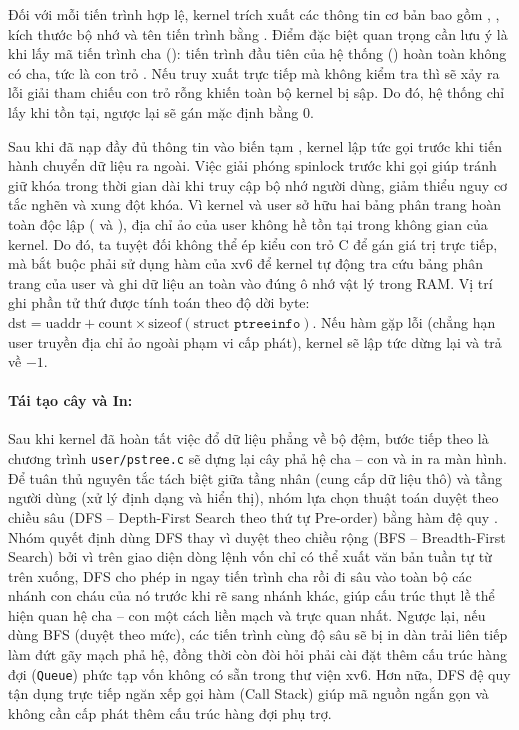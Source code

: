 Đối với mỗi tiến trình hợp lệ, kernel trích xuất các thông tin cơ bản bao gồm
, , kích thước bộ nhớ  và tên tiến trình
bằng . Điểm đặc biệt quan trọng cần lưu ý là khi lấy mã tiến
trình cha (): tiến trình đầu tiên của hệ thống ()
hoàn toàn không có cha, tức là con trỏ . Nếu truy xuất trực
tiếp  mà không kiểm tra thì sẽ xảy ra lỗi giải tham chiếu
con trỏ rỗng khiến toàn bộ kernel bị sập. Do đó, hệ thống chỉ lấy 
khi  tồn tại, ngược lại sẽ gán mặc định bằng $0$.

Sau khi đã nạp đầy đủ thông tin vào biến tạm , kernel lập tức gọi
 trước khi tiến hành chuyển dữ liệu ra ngoài. Việc giải
phóng spinlock trước khi gọi  giúp tránh giữ khóa trong thời gian
dài khi truy cập bộ nhớ người dùng, giảm thiểu nguy cơ tắc nghẽn và xung đột khóa.
Vì kernel và user sở hữu hai bảng phân trang hoàn
toàn độc lập ( và ), địa chỉ ảo
 của user không hề tồn tại trong không gian của kernel. Do đó, ta tuyệt
đối không thể ép kiểu con trỏ C để gán giá trị trực tiếp, mà bắt buộc phải sử
dụng hàm  của xv6 để kernel tự động tra cứu bảng phân trang của
user và ghi dữ liệu an toàn vào đúng ô nhớ vật lý trong RAM. Vị trí ghi phần tử
thứ  được tính toán theo độ dời byte: $\text{dst} = \text{uaddr} + \text{count} \times \text{sizeof}(\text{struct } \texttt{ptreeinfo})$.
Nếu hàm  gặp lỗi (chẳng hạn user truyền địa chỉ ảo ngoài phạm vi cấp phát),
kernel sẽ lập tức dừng lại và trả về $-1$.

\paragraph*{Tái tạo cây và In:} Sau khi kernel đã hoàn tất việc đổ dữ
liệu phẳng về bộ đệm, bước tiếp theo là chương trình \texttt{user/pstree.c}
sẽ dựng lại cây phả hệ cha -- con và in ra màn hình. Để tuân thủ nguyên tắc tách biệt giữa tầng nhân (cung cấp dữ liệu thô) và tầng
người dùng (xử lý định dạng và hiển thị), nhóm lựa chọn thuật toán duyệt theo
chiều sâu (DFS -- Depth-First Search theo thứ tự Pre-order) bằng hàm đệ quy
.
Nhóm quyết định dùng DFS thay vì duyệt theo chiều rộng (BFS -- Breadth-First
Search) bởi vì trên giao diện dòng lệnh vốn chỉ có thể xuất văn bản tuần
tự từ trên xuống, DFS cho phép in ngay tiến trình cha rồi đi sâu vào toàn
bộ các nhánh con cháu của nó trước khi rẽ sang nhánh khác, giúp cấu trúc
thụt lề thể hiện quan hệ cha -- con một cách liền mạch và trực quan nhất.
Ngược lại, nếu dùng BFS (duyệt theo mức), các tiến trình cùng độ sâu sẽ bị
in dàn trải liên tiếp làm đứt gãy mạch phả hệ, đồng thời còn đòi hỏi phải
cài đặt thêm cấu trúc hàng đợi (\texttt{Queue}) phức tạp vốn không có sẵn
trong thư viện xv6. Hơn nữa, DFS đệ quy tận dụng trực tiếp ngăn xếp gọi hàm
(Call Stack) giúp mã nguồn ngắn gọn và không cần cấp phát thêm cấu trúc hàng đợi phụ trợ.

